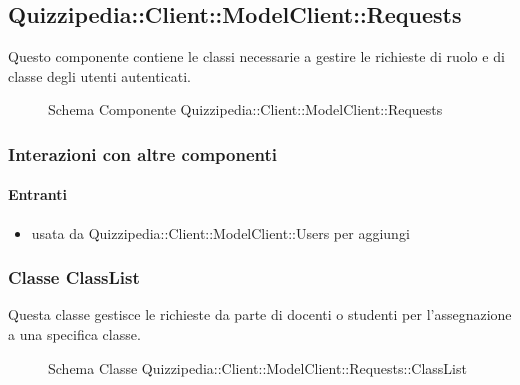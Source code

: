 \subsection{Quizzipedia::Client::ModelClient::Requests}
Questo componente contiene le classi necessarie a gestire le richieste di ruolo e di classe degli utenti autenticati.
\begin{figure}[H]
\centering
\noindent{}
\caption[Schema Componente Quizzipedia::Client::ModelClient::Requests]{Schema Componente Quizzipedia::Client::ModelClient::Requests}
\end{figure}
\subsubsection{Interazioni con altre componenti}
\paragraph{Entranti}
\begin{itemize}
\item usata da Quizzipedia::Client::ModelClient::Users per aggiungi
\end{itemize}
\subsubsection{Classe ClassList}
Questa classe gestisce le richieste da parte di docenti o studenti per l'assegnazione a una specifica classe.
\begin{figure}[H]
\centering
\noindent{}
\caption[Schema Classe ClassList]{Schema Classe Quizzipedia::Client::ModelClient::Requests::ClassList}
\end{figure}
